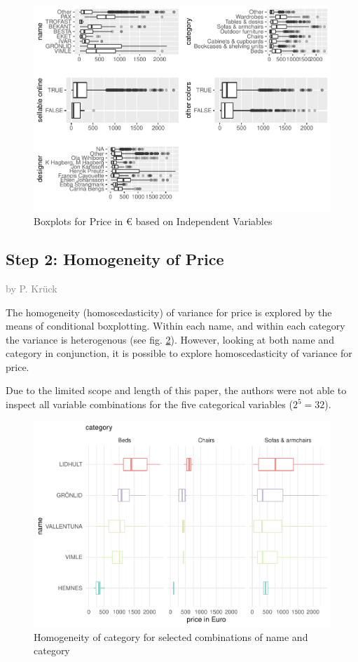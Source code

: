 \documentclass[a4paper, nobind]{templates/ociamthesis}
\begin{document}
\begin{figure}
\includegraphics[width=1\linewidth]{_main_files/figure-latex/outliers-1} \caption{Boxplots for Price in € based on Independent Variables}\label{fig:outliers}
\end{figure}

\hypertarget{step-2-homogeneity-of-price}{%
\subsection{Step 2: Homogeneity of Price}\label{step-2-homogeneity-of-price}}

\textcolor{gray}{by P. Krück}

The homogeneity (homoscedasticity) of variance for price is explored by the means of conditional boxplotting.
Within each name, and within each category the variance is heterogenous (see fig. \ref{fig:homogeneity}). However, looking at both name and category in conjunction, it is possible to explore homoscedasticity of variance for price.

Due to the limited scope and length of this paper, the authors were not able to inspect all variable combinations for the five categorical variables (\(2^5=32\)).

\begin{figure}
\includegraphics[width=1\linewidth]{_main_files/figure-latex/homogeneity-1} \caption{Homogeneity of category for selected combinations of name and category}\label{fig:homogeneity}
\end{figure}
\end{document}
